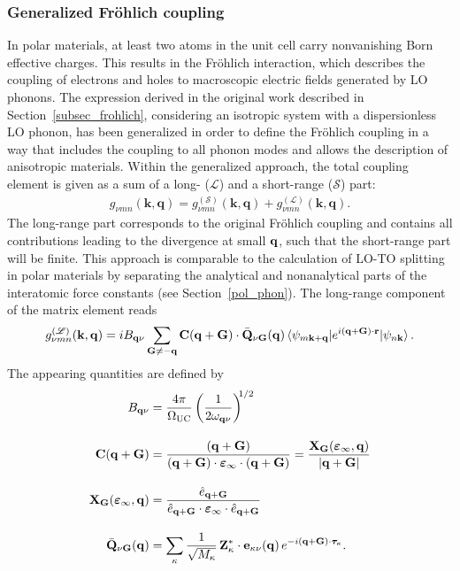 \subsubsection{Generalized Fr\"ohlich coupling}

In polar materials, at least two atoms in the unit cell carry nonvanishing Born effective charges\cite{gonze_lee}. This results in the Fr\"ohlich interaction, which describes the coupling of electrons and holes to macroscopic electric fields generated by LO phonons. The expression derived in the original work\cite{froehlich} described in Section~\ref{subsec_frohlich}, considering an isotropic system with a dispersionless LO phonon, has been generalized\cite{gius_verdi} in order to define the Fr\"ohlich coupling in a way that includes the coupling to all phonon modes and allows the description of anisotropic materials. Within the generalized approach, the total coupling element is given as a sum of a long- ($\mathcal{L}$) and a short-range ($\mathcal{S}$) part:
%
\begin{align}
    g_{\nu mn}(\mathbf{k,q}) = g^{(\mathcal{S})}_{\nu mn}(\mathbf{k,q}) + g^{(\mathcal{L})}_{\nu mn}(\mathbf{k,q}).
\end{align}
The long-range part corresponds to the original Fr\"ohlich coupling and contains all contributions leading to the divergence at small $\mathbf{q}$, such that the short-range part will be finite. This approach is comparable to the calculation of LO-TO splitting in polar materials by separating the analytical and nonanalytical parts of the interatomic force constants (see Section~\ref{pol_phon}). The long-range component of the matrix element reads
%
\begin{equation}\label{frohlich_mel}
  g^{(\mathcal{L})}_{\nu mn}(\mathbf{k,q}) = i B_{\mathbf{q}\nu}\sum_\mathbf{G\neq -q}\mathbf{C(q+G)}\cdot\bar{\mathbf{Q}}_{\nu\mathbf{G}}(\mathbf{q}) \mel{\psi_{m\mathbf{k+q}}}{e^{i\mathbf{(q+G)\cdot r}}}{\psi_{n\mathbf{k}}}.
\end{equation}
%
The appearing quantities are defined by
%
\begin{subequations}\label{subequ_glr}
\begin{align}
B_{\mathbf{q}\nu} & = \frac{4\pi}{\Omega_\text{UC}} \left( \frac{1}{2\omega_{\mathbf{q}\nu}}   \right)^{\!\!1/2}\label{comp1}\\[10pt]
\mathbf{C(q+G)} & = \frac{\mathbf{(q+G)}}{\mathbf{(q+G)}\cdot\boldsymbol{\varepsilon}_\infty\cdot\mathbf{(q+G)}} = \frac{\mathbf{X}_{\mathbf{G}}(\boldsymbol{\varepsilon}_\infty,\mathbf{q})}{|\mathbf{q+G}|} \label{comp2}\\[10pt]
\mathbf{X}_{\mathbf{G}}(\boldsymbol{\varepsilon}_\infty,\mathbf{q}) & = \frac{\hat{e}_\mathbf{q+G}}{\hat{e}_\mathbf{q+G}\cdot\boldsymbol{\varepsilon}_\infty\cdot\hat{e}_\mathbf{q+G}} \label{chi_g}\\[10pt]
\bar{\mathbf{Q}}_{\nu\mathbf{G}}(\mathbf{q}) & = \sum_\kappa\frac{1}{\sqrt{M_\kappa}}\,\mathbf{Z}^*_\kappa\cdot\mathbf{e}_{\kappa\nu}(\mathbf{q})\,e^{-i(\mathbf{q+G})\cdot\boldsymbol{\tau}_{\!\kappa}}.
\end{align}
\end{subequations}
